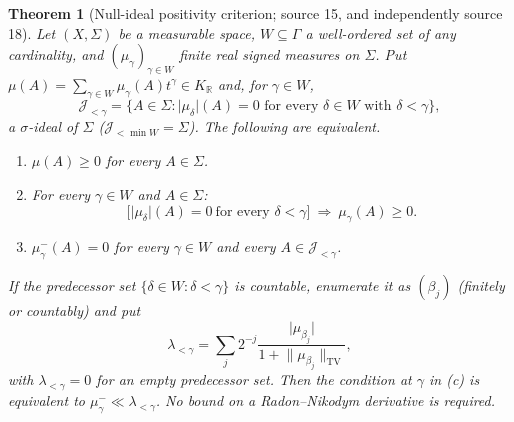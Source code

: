 \documentclass[11pt]{article}
\numberwithin{equation}{section}
\newtheorem{theorem}{Theorem}[section]
\theoremstyle{definition}
\theoremstyle{remark}
\newcommand{\R}{\mathbb R}
\newcommand{\KR}{K_{\R}}
\newcommand{\TV}{\mathrm{TV}}
\newcommand{\norm}[1]{\lVert#1\rVert}
\newcommand{\abs}[1]{\lvert#1\rvert}
\begin{document}
\begin{theorem}[Null-ideal positivity criterion; source 15, and independently
source 18]\label{meas:thm:nullideal}
Let $(X,\Sigma)$ be a measurable space, $W\subseteq\Gamma$ a well-ordered set of
any cardinality, and $(\mu_\gamma)_{\gamma\in W}$ finite real signed measures on
$\Sigma$. Put $\mu(A)=\sum_{\gamma\in W}\mu_\gamma(A)t^\gamma\in\KR$ and, for
$\gamma\in W$,
\begin{equation}\label{meas:eq:nullideal}
 \mathcal J_{<\gamma}=\bigl\{A\in\Sigma:\abs{\mu_\delta}(A)=0
 \text{ for every }\delta\in W\text{ with }\delta<\gamma\bigr\},
\end{equation}
a $\sigma$-ideal of $\Sigma$ ($\mathcal J_{<\min W}=\Sigma$). The following are
equivalent.
\begin{enumerate}[label=(\alph*)]
\item $\mu(A)\ge0$ for every $A\in\Sigma$.
\item For every $\gamma\in W$ and $A\in\Sigma$:
\begin{equation}\label{meas:eq:null-criterion}
 \bigl[\abs{\mu_\delta}(A)=0\ \text{for every }\delta<\gamma\bigr]
 \ \Longrightarrow\ \mu_\gamma(A)\ge0 .
\end{equation}
\item $\mu_\gamma^-(A)=0$ for every $\gamma\in W$ and every $A\in\mathcal J_{<\gamma}$.
\end{enumerate}
If the predecessor set $\{\delta\in W:\delta<\gamma\}$ is countable, enumerate it as
$(\beta_j)$ (finitely or countably) and put
\begin{equation}\label{meas:eq:control}
 \lambda_{<\gamma}=\sum_j2^{-j}\frac{\abs{\mu_{\beta_j}}}{1+\norm{\mu_{\beta_j}}_\TV},
\end{equation}
with $\lambda_{<\gamma}=0$ for an empty predecessor set. Then the condition at
$\gamma$ in (c) is equivalent to $\mu_\gamma^-\ll\lambda_{<\gamma}$. No bound on a
Radon--Nikodym derivative is required.
\end{theorem}
\end{document}

